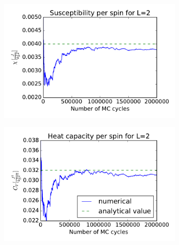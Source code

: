 	\begin{figure}[H]
		\begin{subfigure}[b]{0.49\textwidth}
	\includegraphics[width=1\linewidth]{../results/4b/L_2_susceptibility}
\caption{}
\label{fig:l2susceptibility}
		\end{subfigure}
		\hfill
		\begin{subfigure}[b]{0.49\textwidth}
		\includegraphics[width=1\linewidth]{../results/4b/L_2_heat_capasity}
\caption{}
\label{fig:l2heatcapasity}
		\end{subfigure}
		\caption{}
	\end{figure}





